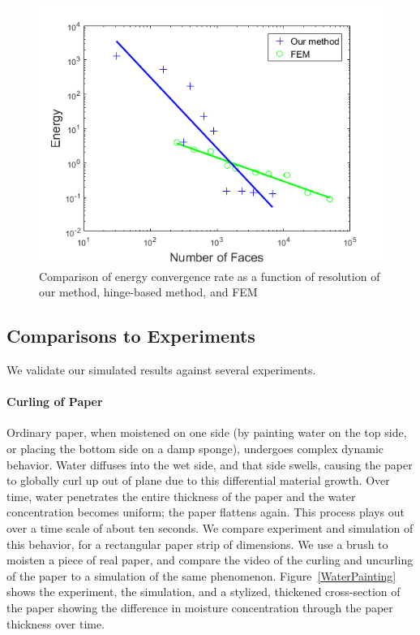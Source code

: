 \documentclass[timestamp,acmtog]{acmart}
\begin{document}
\begin{figure}[h]
  \centering
  \includegraphics[width=\linewidth]{Convergence.png}
  \caption{ Comparison of energy convergence rate as a function of resolution of our method, hinge-based method, and FEM}
  \label{fig:Convergence}
\end{figure}

\subsection{Comparisons to Experiments}
We validate our simulated results against several experiments.
\paragraph{Curling of Paper}
Ordinary paper, when moistened on one side (by painting water on the top side, or placing the bottom side on a damp sponge), undergoes complex dynamic behavior. Water diffuses into the wet side, and that side swells, causing the paper to globally curl up out of plane due to this differential material growth. Over time, water penetrates the entire thickness of the paper and the water concentration becomes uniform; the paper flattens again. This process plays out over a time scale of about ten seconds. We compare experiment and simulation of this behavior, for a rectangular paper strip of dimensions. We use a brush to moisten a piece of real paper, and compare the video of the curling and uncurling of the paper to a simulation of the same phenomenon. Figure~\ref{WaterPainting} shows the experiment, the simulation, and a stylized, thickened cross-section of the paper showing the difference in moisture concentration through the paper thickness over time.
\end{document}
